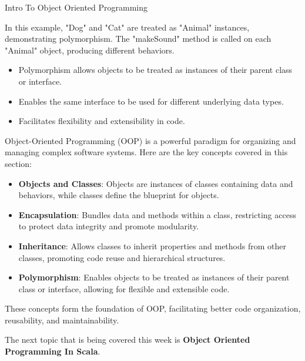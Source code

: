 \begin{notes}{Intro To Object Oriented Programming}
\begin{highlight}[Polymorphism]
        In this example, "Dog" and "Cat" are treated as "Animal" instances, demonstrating polymorphism. The "makeSound" method is called on each "Animal" object, producing different behaviors.
    
        \begin{itemize}
            \item Polymorphism allows objects to be treated as instances of their parent class or interface.
            \item Enables the same interface to be used for different underlying data types.
            \item Facilitates flexibility and extensibility in code.
        \end{itemize}
    
    \end{highlight}
    
    \begin{highlight}
    
        Object-Oriented Programming (OOP) is a powerful paradigm for organizing and managing complex software systems. Here are the key concepts covered in this section:
    
        \begin{itemize}
            \item \textbf{Objects and Classes}: Objects are instances of classes containing data and behaviors, while classes define the blueprint for objects.
            \item \textbf{Encapsulation}: Bundles data and methods within a class, restricting access to protect data integrity and promote modularity.
            \item \textbf{Inheritance}: Allows classes to inherit properties and methods from other classes, promoting code reuse and hierarchical structures.
            \item \textbf{Polymorphism}: Enables objects to be treated as instances of their parent class or interface, allowing for flexible and extensible code.
        \end{itemize}
    
        These concepts form the foundation of OOP, facilitating better code organization, reusability, and maintainability.
    
    \end{highlight}
\end{notes}

The next topic that is being covered this week is \textbf{Object Oriented Programming In Scala}.

